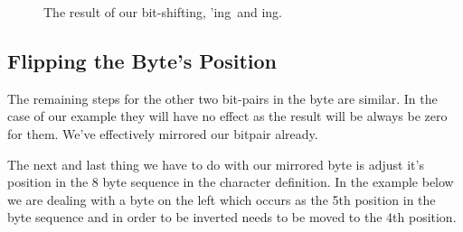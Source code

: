 \begin{figure}[H]
  {
    \setlength{\tabcolsep}{3.0pt}
    \setlength\cmidrulewidth{\lightrulewidth} %
    \begin{adjustbox}{width=10cm,center}
    \end{adjustbox}
  }\caption{The result of our bit-shifting, 'ing\, and ing.}
\end{figure}

\subsection{Flipping the Byte's Position}
The remaining steps for the other two bit-pairs in the byte are similar. In the case of our
example they will have no effect as the result will be always be zero for them. We've
effectively mirrored our bitpair already.

The next and last thing we have to do with our mirrored byte is adjust it's position in the 8 byte sequence
in the character definition. In the example below we are dealing with a byte on
the left which occurs as the 5th position in the byte sequence and in order to be
inverted needs to be moved to the 4th position.

